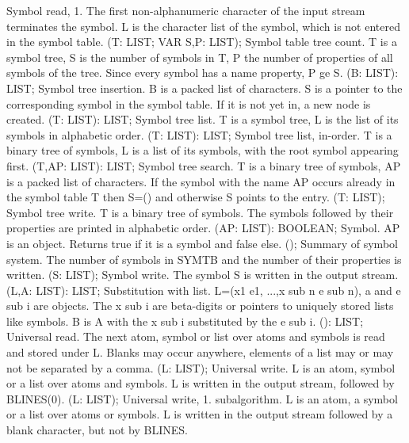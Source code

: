 \bcom Symbol read, 1. The first non-alphanumeric character of the
input stream terminates the symbol.  L is the character list of 
the symbol, which is not entered in the symbol table. \ecom 
{} (T: LIST; VAR S,P: LIST); \eproc
\bcom Symbol table tree count. T is a symbol tree, S is the number
of symbols in T, P the number of properties of all symbols of the tree.
Since every symbol has a name property, P ge S. \ecom 
{} (B: LIST): LIST; \eproc
\bcom Symbol tree insertion. B is a packed list of characters. S is a
pointer to the corresponding symbol in the symbol table. If
it is not yet in, a new node is created. \ecom 
{} (T: LIST): LIST; \eproc
\bcom Symbol tree list. T is a symbol tree, L is the list of its symbols
in alphabetic order. \ecom 
{} (T: LIST): LIST; \eproc
\bcom Symbol tree list, in-order. T is a binary tree of symbols, L is a
list of its symbols, with the root symbol appearing first. \ecom 
{} (T,AP: LIST): LIST; \eproc
\bcom Symbol tree search. T is a binary tree of symbols, AP is a packed
list of characters. If the symbol with the name AP occurs already
in the symbol table T then S=() and otherwise S points to the entry. \ecom 
{} (T: LIST); \eproc
\bcom Symbol tree write. T is a binary tree of symbols. The symbols
followed by their properties are printed in alphabetic order. \ecom 
{} (AP: LIST): BOOLEAN; \eproc
\bcom Symbol. AP is an object. Returns true if it is a symbol and
false else. \ecom 
{} (); \eproc
\bcom Summary of symbol system. The number of symbols in SYMTB and
the number of their properties is written. \ecom 
{} (S: LIST); \eproc
\bcom Symbol write. The symbol S is written in the output stream. \ecom 
{} (L,A: LIST): LIST; \eproc
\bcom Substitution with list. L=(x1 e1, ...,x sub n e sub n),
a and e sub i are objects. The x sub i are beta-digits
or pointers to uniquely stored lists like symbols. B is A
with the x sub i substituted by the e sub i. \ecom 
{} (): LIST; \eproc
\bcom Universal read. The next atom, symbol or list over atoms
and symbols is read and stored under L. Blanks may occur anywhere,
elements of a list may or may not be separated by a comma. \ecom 
{} (L: LIST); \eproc
\bcom Universal write. L is an atom, symbol or a list over
atoms and symbols. L is written in the output stream,
followed by BLINES(0).  \ecom 
{} (L: LIST); \eproc
\bcom Universal write, 1. subalgorithm. L is an atom, a symbol
or a list over atoms or symbols. L is written in the output
stream followed by a blank character, but not by BLINES.  \ecom 
